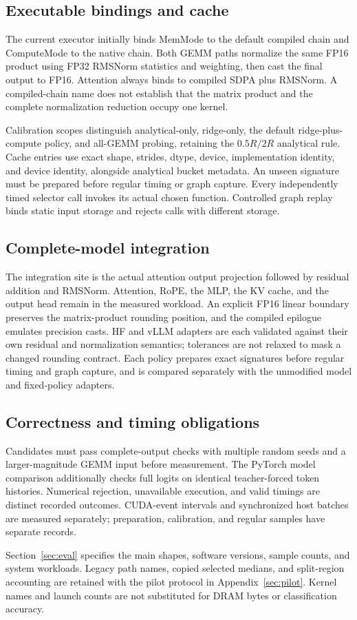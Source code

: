 \subsection{Executable bindings and cache}

The current executor initially binds MemMode to the default compiled chain and ComputeMode to the native chain.
Both GEMM paths normalize the same FP16 product using FP32 RMSNorm statistics and weighting, then cast the final output to FP16.
Attention always binds to compiled SDPA plus RMSNorm.
A compiled-chain name does not establish that the matrix product and the complete normalization reduction occupy one kernel.

Calibration scopes distinguish analytical-only, ridge-only, the default ridge-plus-compute policy, and all-GEMM probing, retaining the $0.5R/2R$ analytical rule.
Cache entries use exact shape, strides, dtype, device, implementation identity, and device identity, alongside analytical bucket metadata.
An unseen signature must be prepared before regular timing or graph capture.
Every independently timed selector call invokes its actual chosen function.
Controlled graph replay binds static input storage and rejects calls with different storage.

\subsection{Complete-model integration}

The integration site is the actual attention output projection followed by residual addition and RMSNorm.
Attention, RoPE, the MLP, the KV cache, and the output head remain in the measured workload.
An explicit FP16 linear boundary preserves the matrix-product rounding position, and the compiled epilogue emulates precision casts.
HF and vLLM adapters are each validated against their own residual and normalization semantics; tolerances are not relaxed to mask a changed rounding contract.
Each policy prepares exact signatures before regular timing and graph capture, and is compared separately with the unmodified model and fixed-policy adapters.

\subsection{Correctness and timing obligations}

Candidates must pass complete-output checks with multiple random seeds and a larger-magnitude GEMM input before measurement.
The PyTorch model comparison additionally checks full logits on identical teacher-forced token histories.
Numerical rejection, unavailable execution, and valid timings are distinct recorded outcomes.
CUDA-event intervals and synchronized host batches are measured separately; preparation, calibration, and regular samples have separate records.

Section~\ref{sec:eval} specifies the main shapes, software versions, sample counts, and system workloads.
Legacy path names, copied selected medians, and split-region accounting are retained with the pilot protocol in Appendix~\ref{sec:pilot}.
Kernel names and launch counts are not substituted for DRAM bytes or classification accuracy.
